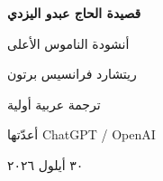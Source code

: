 \documentclass[12pt,a4paper]{article}
\begin{document}
\hypersetup{pageanchor=false}
\begin{titlepage}
  \centering
  \vspace*{2.0cm}
  {\fontsize{32}{44}\selectfont\bfseries قصيدة الحاج عبدو اليزدي\par}
  \vspace{0.55cm}
  {\fontsize{22}{32}\selectfont أنشودة الناموس الأعلى\par}
  \vspace{1.3cm}
  {\fontsize{19}{28}\selectfont ريتشارد فرانسيس برتون\par}
  \vspace{1.6cm}
  {\Large ترجمة عربية أولية\par}
  \vspace{0.4cm}
  {أعدّتها \textenglish{ChatGPT / OpenAI}\par}
  \vfill
  {٣٠ أيلول ٢٠٢٦\par}
\end{titlepage}
\hypersetup{pageanchor=true}



\clearpage
{}
\tableofcontents
















\end{document}
